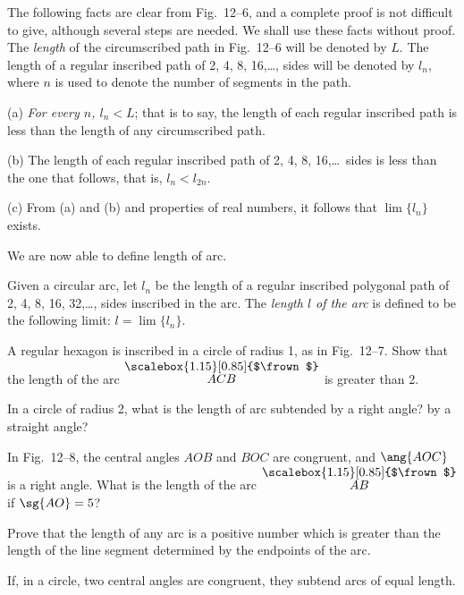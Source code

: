 \documentclass[11pt]{book}
\theoremstyle{bkplain}
\theoremstyle{XIplainnote}
\theoremstyle{bkplain}
\newcommand{\XIIarc}[1]{\overset{\raisebox{-0.25ex}{\scalebox{1.15}[0.85]{$\frown$}}}{#1}}
\theoremstyle{bkplain}
\begin{document}
\FIGXIIFIVESIX

The following facts are clear from Fig.~12--6, and a complete proof is not
difficult to give, although several steps are needed. We shall use these facts
without proof. The \emph{length} of the circumscribed path in Fig.~12--6 will be
denoted by $L$. The length of a regular inscribed path of 2, 4, 8,
16,\ldots, sides will be denoted by $l_n$, where $n$ is used to denote the
number of segments in the path.

(a) \emph{For every $n$, $l_n < L$}; that is to say, the length of each regular
inscribed path is less than the length of any circumscribed path.

(b) The length of each regular inscribed path of 2, 4, 8, 16,\ldots\ sides is
less than the one that follows, that is, $l_n < l_{2n}$.

(c) From (a) and (b) and properties of real numbers, it follows that
$\lim \{l_n\}$ exists.

We are now able to define length of arc.

\begin{definition}
Given a circular arc, let $l_n$ be the length of a regular inscribed polygonal
path of 2, 4, 8, 16, 32,\ldots, sides inscribed in the arc. The \emph{length $l$
of the arc} is defined to be the following limit: $l = \lim \{l_n\}$.
\end{definition}

\begin{exercisecols}
\begin{exlist}
\item A regular hexagon is inscribed in a circle of radius 1, as in
      Fig.~12--7. Show that the length of the arc $\XIIarc{ACB}$ is greater
      than 2.
\exfig{\FIGXIISEVEN}
\item In a circle of radius 2, what is the length of arc subtended by a right
      angle? by a straight angle?
\item In Fig.~12--8, the central angles $AOB$ and $BOC$ are congruent, and
      $\ang{AOC}$ is a right angle. What is the length of the arc $\XIIarc{AB}$
      if $\sg{AO} = 5$?
\exfig{\FIGXIIEIGHT}
\item[\stex 4.] Prove that the length of any arc is a positive number which is
      greater than the length of the line segment determined by the endpoints of
      the arc.
\end{exlist}
\end{exercisecols}

\begin{theorem}
If, in a circle, two central angles are congruent, they subtend arcs of equal
length.
\end{theorem}
\end{document}
